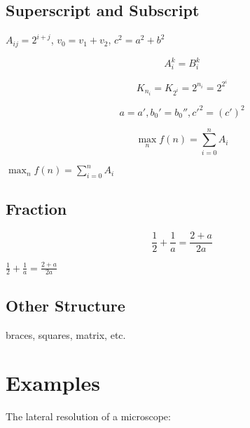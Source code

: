 \documentclass{article}
\begin{document}
\subsection{Superscript and Subscript}
$A_{ij}=2^{i+j}$, $v_0 = v_1 + v_2$, $c^2 = a^2 + b^2$      %

$$A_i^k = B^k_i$$       %

$$K_{n_i} = K_{2^i} = 2^{n_i} = 2^{2^i}$$       %

\[
a = a', b_0' = b_0'', {c'}^2 = (c')^2       %
\]

\[
\max_n f(n) = \sum_{i=0}^n A_i          %
\]

$\max_n f(n) = \sum_{i=0}^n A_i$        %

\subsection{Fraction}
\[
\frac {1}{2} + \frac {1}{a} = \frac{2+a}{2a}
\]

$\frac {1}{2} + \frac {1}{a} = \frac {2+a}{2a}$     %

\subsection{Other Structure}
braces, squares, matrix, etc.

\section{Examples}
The lateral resolution of a microscope:
\end{document}
